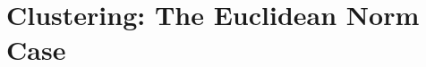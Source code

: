 \documentclass[11pt]{article}
\numberwithin{equation}{section}
\begin{document}
\section{Clustering: The Euclidean Norm Case}

%
%
\end{document}
